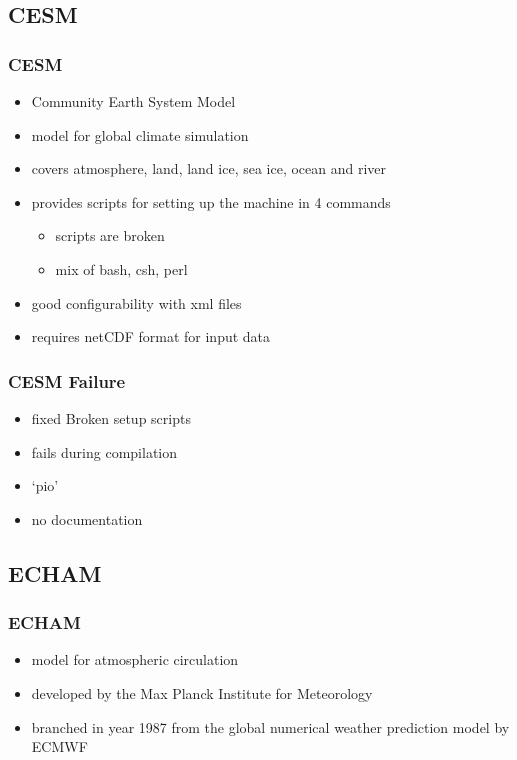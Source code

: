 \documentclass[compress]{beamer}
\begin{document}
\subsection{CESM}
\begin{frame}
    \frametitle{CESM}
    	\begin{itemize}
    	    \item Community Earth System Model
			\item model for global climate simulation
			\item covers atmosphere, land, land ice, sea ice, ocean and river
			\item provides scripts for setting up the machine in 4 commands
	    	\begin{itemize}
		    	\item scripts are broken
		    	\item mix of bash, csh, perl
		    \end{itemize}
		    \item good configurability with xml files
		    \item requires netCDF format for input data \cite{CESMDocs}
		\end{itemize}
\end{frame}

\begin{frame}
    \frametitle{CESM Failure}
    	\begin{itemize}
		    \item fixed Broken setup scripts
		    \item fails during compilation
		    \item `pio'
		    \item no documentation
		\end{itemize}
\end{frame}

\subsection{ECHAM}
\begin{frame}
	\frametitle{ECHAM}
	\begin{itemize}
		\item model for atmospheric circulation
		\item developed by the Max Planck Institute for Meteorology
		\item branched in year 1987 from the global numerical weather prediction model by ECMWF
	\end{itemize}
\end{frame}
\end{document}
